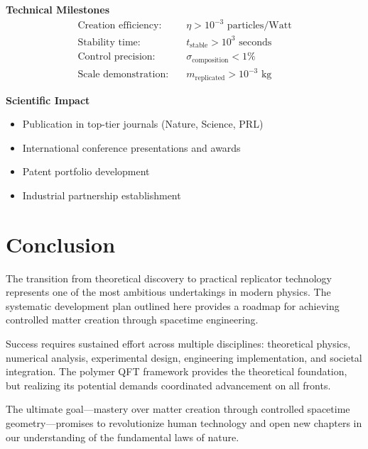 \documentclass[11pt]{article}
\begin{document}
\textbf{Technical Milestones}
\begin{align}
\text{Creation efficiency:} &\quad \eta > 10^{-3} \text{ particles/Watt} \\
\text{Stability time:} &\quad t_{\text{stable}} > 10^{3} \text{ seconds} \\
\text{Control precision:} &\quad \sigma_{\text{composition}} < 1\% \\
\text{Scale demonstration:} &\quad m_{\text{replicated}} > 10^{-3} \text{ kg}
\end{align}

\textbf{Scientific Impact}
\begin{itemize}
\item Publication in top-tier journals (Nature, Science, PRL)
\item International conference presentations and awards
\item Patent portfolio development
\item Industrial partnership establishment
\end{itemize}

\section{Conclusion}

The transition from theoretical discovery to practical replicator technology represents one of the most ambitious undertakings in modern physics. The systematic development plan outlined here provides a roadmap for achieving controlled matter creation through spacetime engineering.

Success requires sustained effort across multiple disciplines: theoretical physics, numerical analysis, experimental design, engineering implementation, and societal integration. The polymer QFT framework provides the theoretical foundation, but realizing its potential demands coordinated advancement on all fronts.

The ultimate goal—mastery over matter creation through controlled spacetime geometry—promises to revolutionize human technology and open new chapters in our understanding of the fundamental laws of nature.
\end{document}
